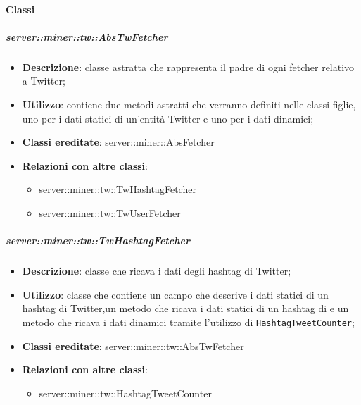 	\paragraph{Classi} %
	\subparagraph{server::miner::tw::AbsTwFetcher} %
		\label{subp:server_miner_tw_AbsTwFetcher}
			\begin{itemize}
				\item \textbf{Descrizione}: classe astratta che rappresenta il padre di ogni fetcher relativo a Twitter;
				\item \textbf{Utilizzo}: contiene due metodi astratti che verranno definiti nelle classi figlie, uno per i dati statici di un'entità Twitter e uno per i dati dinamici;
				\item \textbf{Classi ereditate}: server::miner::AbsFetcher
				\item \textbf{Relazioni con altre classi}:
					\begin{itemize}
						\item server::miner::tw::TwHashtagFetcher
						\item server::miner::tw::TwUserFetcher
					\end{itemize}
			\end{itemize}

	\subparagraph{server::miner::tw::TwHashtagFetcher} %
		\label{subp:server_miner_tw_TwHashtagFetcher}
			\begin{itemize}
				\item \textbf{Descrizione}: classe che ricava i dati degli hashtag di Twitter;
				\item \textbf{Utilizzo}: classe che contiene un campo che descrive i dati statici di un hashtag di Twitter,un metodo che ricava i dati statici di un hashtag di e un metodo che ricava i dati dinamici tramite l'utilizzo di \texttt{HashtagTweetCounter};
				\item \textbf{Classi ereditate}: server::miner::tw::AbsTwFetcher
				\item \textbf{Relazioni con altre classi}:
					\begin{itemize}
						\item server::miner::tw::HashtagTweetCounter
					\end{itemize}
			\end{itemize}

